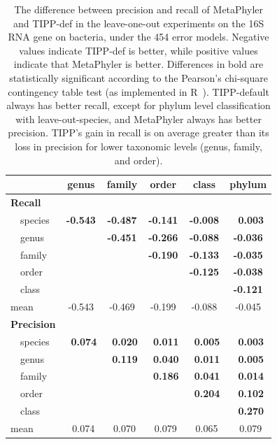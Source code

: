 \begin{table}[hptb]
\caption[Precision-Recall Differences on the 16S RNA gene on 
bacteria, 454 error model.]{\label{tipp:difference.leaveout.454.bacteria} The difference between precision and recall of MetaPhyler and TIPP-def in the leave-one-out experiments on the 16S RNA gene 
on bacteria, under the 454 error models. Negative values
indicate TIPP-def is better, while positive values indicate that MetaPhyler is better.
Differences in bold are statistically significant according to the Pearson's chi-square contingency table test (as implemented in R~\cite{R}). 
TIPP-default always has better recall, except for phylum level classification with leave-out-species, and MetaPhyler always has better precision. 
TIPP's gain in recall is on average greater than its loss in precision for lower taxonomic levels (genus, family, and order). }
\begin{center}
\begin{tabular}{|l||c|c|c|c|c|} \hline
\multicolumn{1}{|l||}{}&\multicolumn{1}{c|}{genus}&\multicolumn{1}{c|}{family}&\multicolumn{1}{c|}{order}&\multicolumn{1}{c|}{class}&\multicolumn{1}{c|}{phylum}\\ \hline
{\bf Recall}&&&&&\\
~~species&{\bf -0.543}&{\bf -0.487}&{\bf -0.141}&{\bf -0.008}&{\bf ~0.003}\\ 
~~genus&&{\bf -0.451}&{\bf -0.266}&{\bf -0.088}&{\bf -0.036}\\ 
~~family&&&{\bf -0.190}&{\bf -0.133}&{\bf -0.035}\\ 
~~order&&&&{\bf -0.125}&{\bf -0.038}\\ 
~~class&&&&&{\bf -0.121}\\ 
mean&-0.543&-0.469&-0.199&-0.088&-0.045\\ 
\hline
{\bf Precision}&&&&&\\
~~species&{\bf ~0.074}&{\bf ~0.020}&{\bf ~0.011}&{\bf ~0.005}&{\bf ~0.003}\\ 
~~genus&&{\bf ~0.119}&{\bf ~0.040}&{\bf ~0.011}&{\bf ~0.005}\\ 
~~family&&&{\bf ~0.186}&{\bf ~0.041}&{\bf ~0.014}\\ 
~~order&&&&{\bf ~0.204}&{\bf ~0.102}\\ 
~~class&&&&&{\bf ~0.270}\\ 
mean&~0.074&~0.070&~0.079&~0.065&~0.079\\ 
\hline
\end{tabular}
\end{center}
\end{table}


